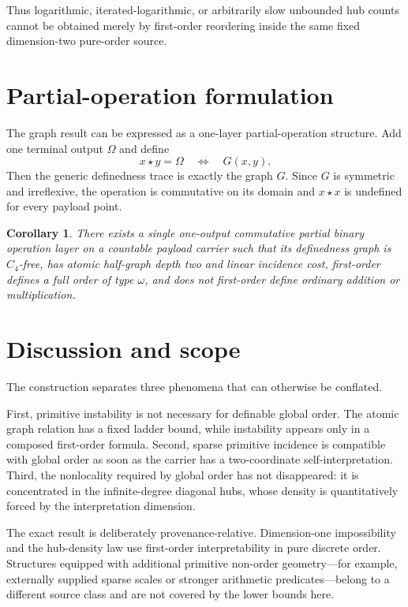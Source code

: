 \documentclass[11pt]{article}
\newtheorem{corollary}[theorem]{Corollary}
\theoremstyle{definition}
\begin{document}
Thus logarithmic, iterated-logarithmic, or arbitrarily slow unbounded hub counts cannot be obtained merely by first-order reordering inside the same fixed dimension-two pure-order source.

\section{Partial-operation formulation}

The graph result can be expressed as a one-layer partial-operation structure.  Add one terminal output $\Omega$ and define
\[
x\star y=\Omega
\quad\Longleftrightarrow\quad
G(x,y).
\]
Then the generic definedness trace is exactly the graph $G$.  Since $G$ is symmetric and irreflexive, the operation is commutative on its domain and $x\star x$ is undefined for every payload point.

\begin{corollary}
There exists a single one-output commutative partial binary operation layer on a countable payload carrier such that its definedness graph is $C_4$-free, has atomic half-graph depth two and linear incidence cost, first-order defines a full order of type $\omega$, and does not first-order define ordinary addition or multiplication.
\end{corollary}

\section{Discussion and scope}

The construction separates three phenomena that can otherwise be conflated.

First, primitive instability is not necessary for definable global order.  The atomic graph relation has a fixed ladder bound, while instability appears only in a composed first-order formula.  Second, sparse primitive incidence is compatible with global order as soon as the carrier has a two-coordinate self-interpretation.  Third, the nonlocality required by global order has not disappeared: it is concentrated in the infinite-degree diagonal hubs, whose density is quantitatively forced by the interpretation dimension.

The exact result is deliberately provenance-relative.  Dimension-one impossibility and the hub-density law use first-order interpretability in pure discrete order.  Structures equipped with additional primitive non-order geometry---for example, externally supplied sparse scales or stronger arithmetic predicates---belong to a different source class and are not covered by the lower bounds here.
\end{document}
